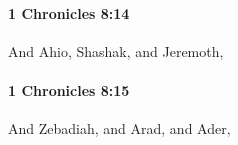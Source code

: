 		\paragraph{1 Chronicles 8:14} %
			\label{1CHRONICLES-8-14}

			And Ahio, Shashak, and Jeremoth,


		\paragraph{1 Chronicles 8:15} %
			\label{1CHRONICLES-8-15}

			And Zebadiah, and Arad, and Ader,


